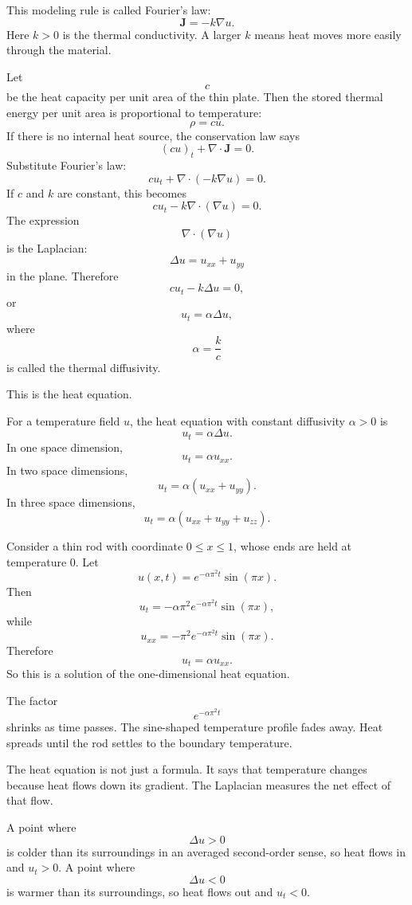 This modeling rule is called Fourier's law:
\[
\boxed{
    \mathbf J=-k\nabla u.
}
\]
Here \(k>0\) is the thermal conductivity.  A larger \(k\) means heat moves more easily
through the material.

Let
\[
    c
\]
be the heat capacity per unit area of the thin plate.  Then the stored thermal energy per
unit area is proportional to temperature:
\[
    \rho=c u.
\]
If there is no internal heat source, the conservation law says
\[
    (cu)_t+\nabla\cdot\mathbf J=0.
\]
Substitute Fourier's law:
\[
    c u_t+\nabla\cdot(-k\nabla u)=0.
\]
If \(c\) and \(k\) are constant, this becomes
\[
    c u_t-k\nabla\cdot(\nabla u)=0.
\]
The expression
\[
    \nabla\cdot(\nabla u)
\]
is the Laplacian:
\[
\boxed{
    \Delta u=u_{xx}+u_{yy}
}
\]
in the plane.  Therefore
\[
    c u_t-k\Delta u=0,
\]
or
\[
\boxed{
    u_t=\alpha\Delta u,
}
\]
where
\[
    \alpha=\frac{k}{c}
\]
is called the thermal diffusivity.

This is the heat equation.

\begin{definition}
For a temperature field \(u\), the heat equation with constant diffusivity \(\alpha>0\)
is
\[
\boxed{
    u_t=\alpha\Delta u.
}
\]
In one space dimension,
\[
\boxed{
    u_t=\alpha u_{xx}.
}
\]
In two space dimensions,
\[
\boxed{
    u_t=\alpha(u_{xx}+u_{yy}).
}
\]
In three space dimensions,
\[
\boxed{
    u_t=\alpha(u_{xx}+u_{yy}+u_{zz}).
}
\]
\end{definition}

\begin{example}
Consider a thin rod with coordinate \(0\le x\le1\), whose ends are held at temperature
\(0\).  Let
\[
    u(x,t)=e^{-\alpha\pi^2t}\sin(\pi x).
\]
Then
\[
    u_t=-\alpha\pi^2e^{-\alpha\pi^2t}\sin(\pi x),
\]
while
\[
    u_{xx}=-\pi^2e^{-\alpha\pi^2t}\sin(\pi x).
\]
Therefore
\[
    u_t=\alpha u_{xx}.
\]
So this is a solution of the one-dimensional heat equation.

The factor
\[
    e^{-\alpha\pi^2t}
\]
shrinks as time passes.  The sine-shaped temperature profile fades away.  Heat spreads
until the rod settles to the boundary temperature.
\end{example}

The heat equation is not just a formula.  It says that temperature changes because heat
flows down its gradient.  The Laplacian measures the net effect of that flow.

A point where
\[
    \Delta u>0
\]
is colder than its surroundings in an averaged second-order sense, so heat flows in and
\(u_t>0\).  A point where
\[
    \Delta u<0
\]
is warmer than its surroundings, so heat flows out and \(u_t<0\).


